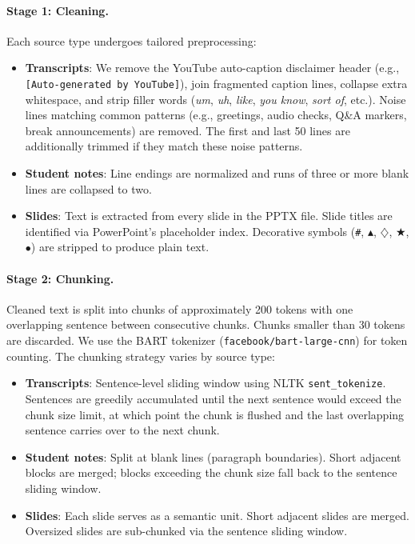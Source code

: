 \paragraph{Stage 1: Cleaning.}
Each source type undergoes tailored preprocessing:
\begin{itemize}
    \item \textbf{Transcripts}: We remove the YouTube auto-caption disclaimer header (e.g., \texttt{[Auto-generated by YouTube]}), join fragmented caption lines, collapse extra whitespace, and strip filler words (\textit{um}, \textit{uh}, \textit{like}, \textit{you know}, \textit{sort of}, etc.). Noise lines matching common patterns (e.g., greetings, audio checks, Q\&A markers, break announcements) are removed. The first and last 50 lines are additionally trimmed if they match these noise patterns.
    \item \textbf{Student notes}: Line endings are normalized and runs of three or more blank lines are collapsed to two.
    \item \textbf{Slides}: Text is extracted from every slide in the PPTX file. Slide titles are identified via PowerPoint's placeholder index. Decorative symbols (\texttt{\#}, $\blacktriangle$, $\diamondsuit$, $\bigstar$, $\bullet$) are stripped to produce plain text.
\end{itemize}

\paragraph{Stage 2: Chunking.}
Cleaned text is split into chunks of approximately 200 tokens with one overlapping sentence between consecutive chunks. Chunks smaller than 30 tokens are discarded. We use the BART tokenizer (\texttt{facebook/bart-large-cnn}) for token counting. The chunking strategy varies by source type:
\begin{itemize}
    \item \textbf{Transcripts}: Sentence-level sliding window using NLTK \texttt{sent\_tokenize}. Sentences are greedily accumulated until the next sentence would exceed the chunk size limit, at which point the chunk is flushed and the last overlapping sentence carries over to the next chunk.
    \item \textbf{Student notes}: Split at blank lines (paragraph boundaries). Short adjacent blocks are merged; blocks exceeding the chunk size fall back to the sentence sliding window.
    \item \textbf{Slides}: Each slide serves as a semantic unit. Short adjacent slides are merged. Oversized slides are sub-chunked via the sentence sliding window.
\end{itemize}


